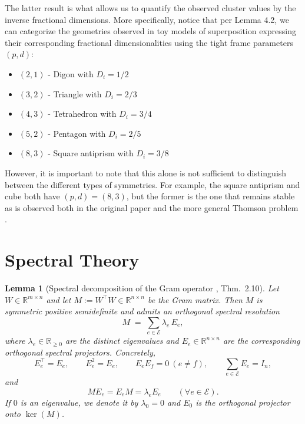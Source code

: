 \documentclass{article}
\theoremstyle{plain}
\newtheorem{lemma}{Lemma}[section]
\numberwithin{equation}{section}
\theoremstyle{definition}
\theoremstyle{remark}
\begin{document}
\noindent The latter result is what allows us to quantify the observed cluster values by the inverse fractional dimensions. More specifically, notice that per Lemma 4.2, we can categorize the geometries observed in toy models of superposition \cite{toymodels} expressing their corresponding fractional dimensionalities using the tight frame parameters $(p, d)$: 
\begin{itemize}
    \item $(2, 1)$ - Digon with $D_i = 1/2$
    \item $(3, 2)$ - Triangle with $D_i = 2/3$
    \item $(4, 3)$ - Tetrahedron with $D_i = 3/4$
    \item $(5, 2)$ - Pentagon with $D_i = 2/5$
    \item $(8, 3)$ - Square antiprism with $D_i= 3/8$
\end{itemize}
However, it is important to note that this alone is not sufficient to distinguish between the different types of symmetries. For example, the square antiprism and cube both have $(p, d) = (8, 3)$, but the former is the one that remains stable as is observed both in the original paper and the more general Thomson problem \cite{thomson}. 

\section{Spectral Theory}
\label{appendix:spectral_theory}
\begin{lemmaproofbox}
\begin{lemma}[Spectral decomposition of the Gram operator \citep{kato}, Thm.~2.10]\label{lemma:spectral-decomposition}
Let $W\in\mathbb{R}^{m\times n}$ and let $M := W^\top W\in\mathbb{R}^{n\times n}$ be the Gram matrix.
Then $M$ is symmetric positive semidefinite and admits an orthogonal spectral resolution
\[
M \;=\; \sum_{e\in\mathcal{E}} \lambda_e\, E_e ,
\]
where $\lambda_e\in\mathbb{R}_{\ge 0}$ are the distinct eigenvalues and $E_e\in\mathbb{R}^{n\times n}$ are the corresponding orthogonal spectral projectors. Concretely,
\[
E_e^\top = E_e,\qquad E_e^2 = E_e,\qquad E_eE_f = 0\ (e\neq f),\qquad \sum_{e\in\mathcal{E}} E_e = I_n,
\]
and
\[
ME_e = E_eM = \lambda_e E_e\qquad (\forall e\in\mathcal{E}).
\]
If $0$ is an eigenvalue, we denote it by $\lambda_0=0$ and $E_0$ is the orthogonal projector onto $\ker(M)$.
\end{lemma}
\end{lemmaproofbox}
\end{document}
